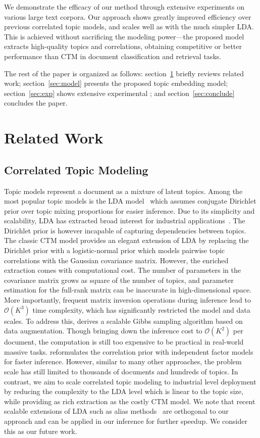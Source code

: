 \documentclass[sigconf]{acmart}
\begin{document}
We demonstrate the efficacy of our method through extensive experiments on various large text corpora. Our approach shows greatly improved efficiency over previous correlated topic models, and scales well as with the much simpler LDA. This is achieved without sacrificing the modeling power---the proposed model extracts high-quality topics and correlations, obtaining competitive or better performance than CTM in document classification and retrieval tasks.  

The rest of the paper is organized as follows: section~\ref{sec:related} briefly reviews related work; section~\ref{sec:model} presents the proposed topic embedding model; section~\ref{sec:exp} shows extensive experimental ; and section~\ref{sec:conclude} concludes the paper.


\section{Related Work}\label{sec:related}
%
\subsection{Correlated Topic Modeling}
Topic models represent a document as a mixture of latent topics. Among the most popular topic models is the LDA model~\cite{blei2003latent} which assumes conjugate Dirichlet prior over topic mixing proportions for easier inference. Due to its simplicity and scalability, LDA has extracted broad interest for industrial applications~\cite{yuan2015lightlda,wang2015peacock}. 
The Dirichlet prior is however incapable of capturing dependencies between topics. The classic CTM model provides an elegant extension of LDA by replacing the Dirichlet prior with a logistic-normal prior which models pairwise topic correlations with the Gaussian covariance matrix. However, the enriched extraction comes with computational cost. The number of parameters in the covariance matrix grows as square of the number of topics, and parameter estimation for the full-rank matrix can be inaccurate in high-dimensional space. More importantly, frequent matrix inversion operations during inference lead to $\mathcal{O}(K^3)$ time complexity, which has significantly restricted the model and data scales. To address this, \citet{chen2013scalable} derives a scalable Gibbs sampling algorithm based on data augmentation. Though bringing down the inference cost to $\mathcal{O}(K^2)$ per document, the computation is still too expensive to be practical in real-world massive tasks. \citet{putthividhya2009independent} reformulates the correlation prior with independent factor models for faster inference. However, similar to many other approaches, the problem scale has still limited to thousands of documents and hundreds of topics. In contrast, we aim to scale correlated topic modeling to industrial level deployment by reducing the complexity to the LDA level which is linear to the topic size, while providing as rich extraction as the costly CTM model. We note that recent scalable extensions of LDA such as alias methods~\cite{li2014reducing,yuan2015lightlda} are orthogonal to our approach and can be applied in our inference for further speedup. We consider this as our future work. 
\end{document}
